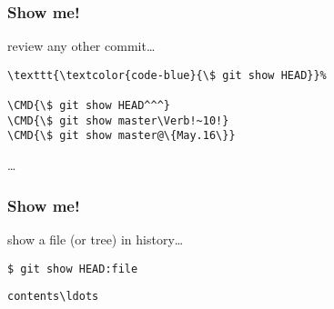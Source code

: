 \documentclass[english]{beamer}
\newcommand{\CMD}[1]{%
\texttt{\textcolor{code-blue}{#1}}%
}
\begin{document}
\begin{frame}[fragile]
\frametitle{Show me!}

review any other commit\ldots
\vspace{\baselineskip}

\begin{Verbatim}[commandchars=\\\{\}]
\CMD{\$ git show HEAD}
\CMD{\$ git show HEAD^^^}
\CMD{\$ git show master\Verb!~10!}
\CMD{\$ git show master@\{May.16\}}
\end{Verbatim}

\ldots

\vspace{\textheight}
\end{frame}

\begin{frame}[fragile]
\frametitle{Show me!}

show a file (or tree) in history\ldots
\vspace{\baselineskip}

\CMD{\$ git show HEAD:file}
{\small
\begin{Verbatim}[commandchars=\\\{\}]
contents\ldots
\end{Verbatim}
}
\vspace{\textheight}
\end{frame}
\end{document}
